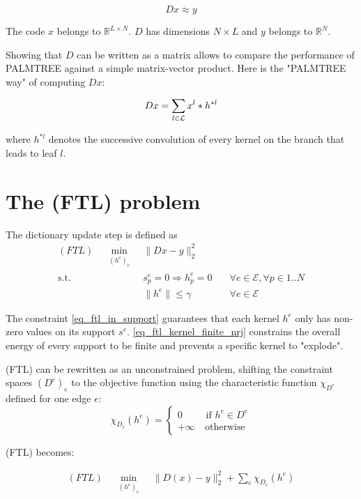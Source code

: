 $$Dx \approx y$$

The code $x$ belongs to $\mathbb{R}^{L\times N}$. $D$ has dimensions $N \times L$ and $y$ belongs to $\mathbb{R}^N$. 

Showing that $D$ can be written as a matrix allows to compare the performance of PALMTREE against a simple matrix-vector product. Here is the "PALMTREE way" of computing $Dx$:

\begin{align}
	Dx = \sum_{l \in \mathcal L} x^{l} * h^{*l}	 \label{eq_Dx_as_convolution}
\end{align}

where $h^{*l}$ denotes the successive convolution of every kernel on the branch that leads to leaf $l$.



\section{The (FTL) problem}

The dictionary update step is defined as 
\begin{align}
(FTL) \quad \underset{\substack{(h^\text{e})_{e}}}\min & \lVert Dx - y \rVert_2^2 \label{eq_ftl_energy}\\
\text{s.t. } & s^e_p=0 \Rightarrow h^e_p = 0 \quad & \forall e \in \mathcal{E}, \forall p \in 1..N \label{eq_ftl_in_support} \\
 & \lVert h^e \rVert \le \gamma & \forall e \in \mathcal{E}\label{eq_ftl_kernel_finite_nrj}
\end{align}

The constraint \ref{eq_ftl_in_support} guarantees that each kernel $h^e$ only has non-zero values on its support $s^e$. \ref{eq_ftl_kernel_finite_nrj} constrains the overall energy of every support to be finite and prevents a specific kernel to "explode".

(FTL) can be rewritten as an unconstrained problem, shifting the constraint spaces $(D^e)_e$ to the objective function using the characteristic function $\chi_{D^e}$ defined for one edge $e$:
$$\chi_{D_e}(h^e) = \begin{cases} 0 &\text{ if } h^e \in D^e \\ +\infty & \ \text{otherwise}\end{cases}$$

(FTL) becomes:

\begin{align}
(FTL) \quad \underset{\substack{(h^\text{e})_{e}}}\min & \lVert D(x) - y \rVert_2^2 + \sum_{e}\chi_{D_e} (h^e)
\end{align}

